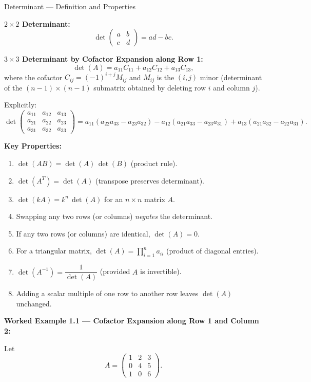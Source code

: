 \documentclass[12pt,a4paper]{article}
\begin{document}
\begin{infobox}{Determinant --- Definition and Properties}

\textbf{$2\times2$ Determinant:}
\[
\det\!\begin{pmatrix} a & b \\ c & d \end{pmatrix} = ad - bc.
\]

\textbf{$3\times3$ Determinant by Cofactor Expansion along Row 1:}
\[
\det(A) = a_{11}C_{11} + a_{12}C_{12} + a_{13}C_{13},
\]
where the cofactor $C_{ij} = (-1)^{i+j}M_{ij}$ and $M_{ij}$ is the $(i,j)$ minor (determinant of the
$(n-1)\times(n-1)$ submatrix obtained by deleting row $i$ and column $j$).

Explicitly:
\[
\det\!\begin{pmatrix}a_{11}&a_{12}&a_{13}\\a_{21}&a_{22}&a_{23}\\a_{31}&a_{32}&a_{33}\end{pmatrix}
= a_{11}(a_{22}a_{33}-a_{23}a_{32})
  - a_{12}(a_{21}a_{33}-a_{23}a_{31})
  + a_{13}(a_{21}a_{32}-a_{22}a_{31}).
\]

\textbf{Key Properties:}
\begin{enumerate}[label=P\arabic*.]
  \item $\det(AB) = \det(A)\,\det(B)$ \quad (product rule).
  \item $\det(A^T) = \det(A)$ \quad (transpose preserves determinant).
  \item $\det(kA) = k^n\,\det(A)$ for an $n\times n$ matrix $A$.
  \item Swapping any two rows (or columns) \emph{negates} the determinant.
  \item If any two rows (or columns) are identical, $\det(A)=0$.
  \item For a triangular matrix, $\det(A) = \prod_{i=1}^{n} a_{ii}$ (product of diagonal entries).
  \item $\det(A^{-1}) = \dfrac{1}{\det(A)}$ (provided $A$ is invertible).
  \item Adding a scalar multiple of one row to another row leaves $\det(A)$ unchanged.
\end{enumerate}
\end{infobox}

\textbf{Worked Example 1.1 --- Cofactor Expansion along Row 1 and Column 2:}

Let
\[
A = \begin{pmatrix} 1 & 2 & 3 \\ 0 & 4 & 5 \\ 1 & 0 & 6 \end{pmatrix}.
\]
\end{document}
